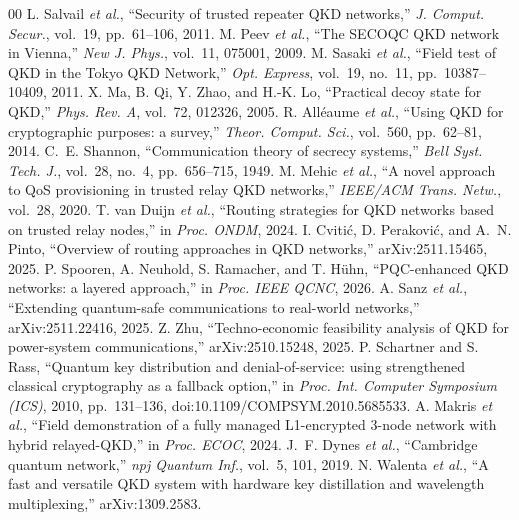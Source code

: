 \documentclass[conference]{IEEEtran}
\begin{document}
\begin{thebibliography}{00}
 L. Salvail \emph{et al.}, ``Security of trusted repeater QKD networks,'' \emph{J. Comput. Secur.}, vol.~19, pp.~61--106, 2011.
 M. Peev \emph{et al.}, ``The SECOQC QKD network in Vienna,'' \emph{New J. Phys.}, vol.~11, 075001, 2009.
 M. Sasaki \emph{et al.}, ``Field test of QKD in the Tokyo QKD Network,'' \emph{Opt. Express}, vol.~19, no.~11, pp.~10387--10409, 2011.
 X. Ma, B. Qi, Y. Zhao, and H.-K. Lo, ``Practical decoy state for QKD,'' \emph{Phys. Rev. A}, vol.~72, 012326, 2005.
 R. All\'eaume \emph{et al.}, ``Using QKD for cryptographic purposes: a survey,'' \emph{Theor. Comput. Sci.}, vol.~560, pp.~62--81, 2014.
 C.~E. Shannon, ``Communication theory of secrecy systems,'' \emph{Bell Syst. Tech. J.}, vol.~28, no.~4, pp.~656--715, 1949.
 M. Mehic \emph{et al.}, ``A novel approach to QoS provisioning in trusted relay QKD networks,'' \emph{IEEE/ACM Trans. Netw.}, vol.~28, 2020.
 T. van Duijn \emph{et al.}, ``Routing strategies for QKD networks based on trusted relay nodes,'' in \emph{Proc. ONDM}, 2024.
 I. Cviti\'c, D. Perakovi\'c, and A.~N. Pinto, ``Overview of routing approaches in QKD networks,'' arXiv:2511.15465, 2025.
 P. Spooren, A. Neuhold, S. Ramacher, and T. H\"uhn, ``PQC-enhanced QKD networks: a layered approach,'' in \emph{Proc. IEEE QCNC}, 2026.
 A. Sanz \emph{et al.}, ``Extending quantum-safe communications to real-world networks,'' arXiv:2511.22416, 2025.
 Z. Zhu, ``Techno-economic feasibility analysis of QKD for power-system communications,'' arXiv:2510.15248, 2025.
 P. Schartner and S. Rass, ``Quantum key distribution and denial-of-service: using strengthened classical cryptography as a fallback option,'' in \emph{Proc. Int. Computer Symposium (ICS)}, 2010, pp.~131--136, doi:10.1109/COMPSYM.2010.5685533. %
 A. Makris \emph{et al.}, ``Field demonstration of a fully managed L1-encrypted 3-node network with hybrid relayed-QKD,'' in \emph{Proc. ECOC}, 2024.
 J.~F. Dynes \emph{et al.}, ``Cambridge quantum network,'' \emph{npj Quantum Inf.}, vol.~5, 101, 2019.
 N. Walenta \emph{et al.}, ``A fast and versatile QKD system with hardware key distillation and wavelength multiplexing,'' arXiv:1309.2583.

\end{thebibliography}
\end{document}

